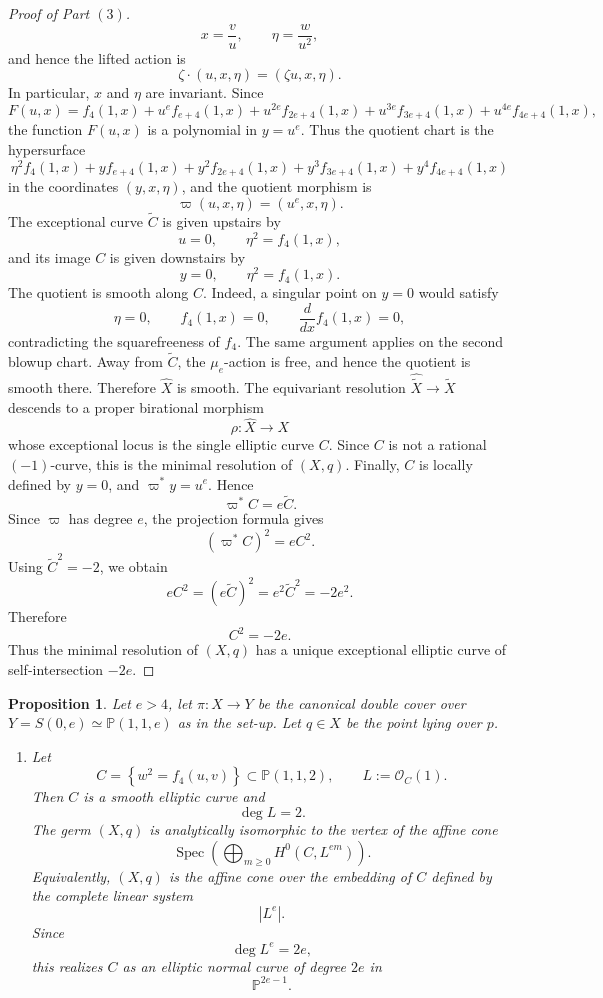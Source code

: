\documentclass[11pt,twoside]{amsart}
\theoremstyle{plain}
\numberwithin{equation}{section}
\newtheorem{proposition}[theorem]{Proposition}
\theoremstyle{definition}
\begin{document}
\begin{proof}[Proof of Part $(3)$]
$$
x=\frac vu,
\qquad
\eta=\frac{w}{u^2},
$$
and hence the lifted action is
$$
\zeta\cdot(u,x,\eta) =
(\zeta u,x,\eta).
$$
In particular, $x$ and $\eta$ are invariant. Since
$$
F(u,x) =
f_4(1,x)
+
u^ef_{e+4}(1,x)
+
u^{2e}f_{2e+4}(1,x)
+
u^{3e}f_{3e+4}(1,x)
+
u^{4e}f_{4e+4}(1,x),
$$
the function $F(u,x)$ is a polynomial in $y=u^e$. Thus the quotient chart is the hypersurface
$$
\eta^2
f_4(1,x)
+
yf_{e+4}(1,x)
+
y^2f_{2e+4}(1,x)
+
y^3f_{3e+4}(1,x)
+
y^4f_{4e+4}(1,x)
$$
in the coordinates $(y,x,\eta)$, and the quotient morphism is
$$
\varpi(u,x,\eta)=(u^e,x,\eta).
$$
The exceptional curve $\widetilde C$ is given upstairs by
$$
u=0,
\qquad
\eta^2=f_4(1,x),
$$
and its image $C$ is given downstairs by
$$
y=0,
\qquad
\eta^2=f_4(1,x).
$$
The quotient is smooth along $C$. Indeed, a singular point on $y=0$ would satisfy
$$
\eta=0,
\qquad
f_4(1,x)=0,
\qquad
\frac{d}{dx}f_4(1,x)=0,
$$
contradicting the squarefreeness of $f_4$. The same argument applies on the second blowup chart. Away from $\widetilde C$, the $\mu_e$-action is free, and hence the quotient is smooth there. Therefore $\widehat X$ is smooth. The equivariant resolution $\widehat{\widetilde X}\to\widetilde X$ descends to a proper birational morphism
$$
\rho:\widehat X\longrightarrow X
$$
whose exceptional locus is the single elliptic curve $C$. Since $C$ is not a rational $(-1)$-curve, this is the minimal resolution of $(X,q)$. Finally, $C$ is locally defined by $y=0$, and $\varpi^*y=u^e$. Hence
$$
\varpi^*C=e\widetilde C.
$$
Since $\varpi$ has degree $e$, the projection formula gives
$$
(\varpi^*C)^2=eC^2.
$$
Using $\widetilde C^2=-2$, we obtain
$$
eC^2 = (e\widetilde C)^2 =e^2\widetilde C^2 = -2e^2.
$$
Therefore
$$
C^2=-2e.
$$
Thus the minimal resolution of $(X,q)$ has a unique exceptional elliptic curve of self-intersection $-2e$.












\end{proof}
\begin{proposition}
Let $e>4$, let $\pi:X\longrightarrow Y$
be the canonical double cover over $Y=S(0,e)\simeq \mathbb{P}(1,1,e)$ as in the set-up. Let $q\in X$ be the point lying over $p$.
\begin{enumerate}
    \item Let
    $$
    C
    =
    \left\{
    w^2=f_4(u,v)
    \right\}
    \subset
    \mathbb{P}(1,1,2),
    \qquad
    L:=\mathcal{O}_C(1).
    $$
    Then $C$ is a smooth elliptic curve and
    $$
    \deg L=2.
    $$
    The germ $(X,q)$ is analytically isomorphic to the vertex of the affine cone
    $$
    \operatorname{Spec}
    \left(
    \bigoplus_{m\geq 0}
    H^0(C,L^{em})
    \right).
    $$
    Equivalently, $(X,q)$ is the affine cone over the embedding of $C$ defined by the complete linear system
    $$
    |L^e|.
    $$
    Since
    $$
    \deg L^e=2e,
    $$
    this realizes $C$ as an elliptic normal curve of degree $2e$ in
    $$
    \mathbb{P}^{2e-1}.
    $$

    
\end{enumerate}
\end{proposition}
\end{document}
